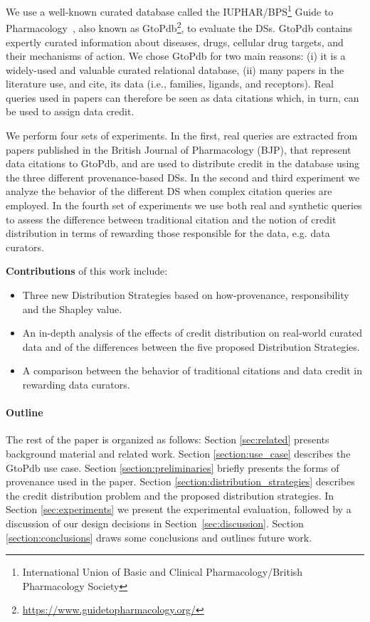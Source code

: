 \documentclass[preprint,12pt,sort&compress]{elsarticle}
\begin{document}
We use a well-known curated database called the IUPHAR/BPS\footnote{International Union of Basic and Clinical Pharmacology/British Pharmacology Society} Guide to Pharmacology~\citep{iuphar2018}, also known as GtoPdb\footnote{\url{https://www.guidetopharmacology.org/}}, to evaluate the DSs.  GtoPdb contains expertly curated information about diseases, drugs, cellular drug targets, and their mechanisms of action.
We chose GtoPdb for two main reasons: (i) it is a widely-used and valuable curated relational database, (ii) many papers in the literature use, and cite, its data (i.e., families, ligands, and receptors). 
Real queries used in papers can therefore be seen as data citations which, in turn, can be used to assign data credit.

We perform four sets of experiments. In the first, real queries are extracted from papers published in the British Journal of Pharmacology (BJP), that represent data citations to GtoPdb, and are used to distribute credit in the database using the three different provenance-based DSs. 
In the second and third experiment we analyze the behavior of the different DS when complex citation queries are employed.
In the fourth set of experiments we use both real and synthetic queries to assess the difference between traditional citation and the notion of credit distribution in terms of rewarding those responsible for the data, e.g. data curators.

\textbf{Contributions}
 of this work include:
\begin{itemize}
    \item Three new Distribution Strategies based on how-provenance, responsibility and the Shapley value.
    \item An in-depth analysis of the effects of credit distribution on real-world curated data and of the differences between the five proposed Distribution Strategies.
    \item A comparison between the behavior of traditional citations and data credit in rewarding data curators.
\end{itemize}

\paragraph{\textbf{Outline}} The rest of the paper is organized as follows:
Section \ref{sec:related} presents background material and related work.   Section \ref{section:use_case} describes the GtoPdb use case. Section \ref{section:preliminaries} briefly presents the forms of provenance used in the paper.  Section \ref{section:distribution_strategies} describes the credit distribution problem and the proposed distribution strategies.  In Section \ref{sec:experiments} we present the experimental evaluation, followed by a discussion of our design decisions in Section~\ref{sec:discussion}. Section \ref{section:conclusions} draws some conclusions and outlines future work.
\end{document}
